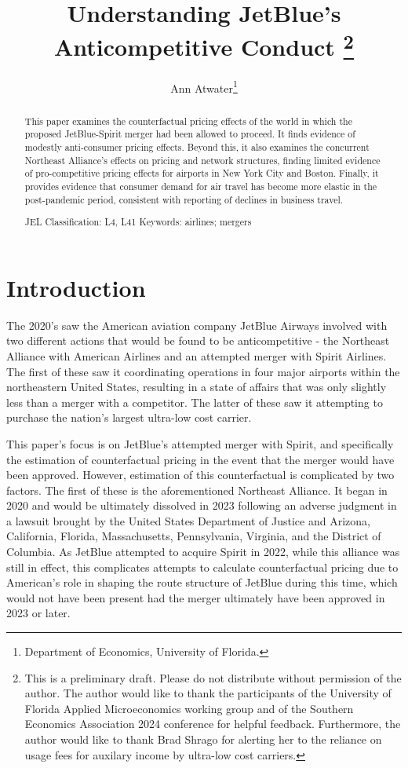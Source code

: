 \documentclass{article}
\author{Ann Atwater\footnote{Department of Economics, University of Florida.}}
\title{Understanding JetBlue's Anticompetitive Conduct \footnote{This is a preliminary draft. Please do not distribute without permission of the author. The author would like to thank the participants of the University of Florida Applied Microeconomics working group and of the Southern Economics Association 2024 conference for helpful feedback. Furthermore, the author would like to thank Brad Shrago for alerting her to the reliance on usage fees for auxilary income by ultra-low cost carriers. }}
\begin{document}
	\maketitle
	
	\begin{abstract}
	This paper examines the counterfactual pricing effects of the world in which the proposed JetBlue-Spirit merger had been allowed to proceed. It finds evidence of modestly anti-consumer pricing effects. Beyond this, it also examines the concurrent Northeast Alliance's effects on pricing and network structures, finding limited evidence of pro-competitive pricing effects for airports in New York City and Boston. Finally, it provides evidence that consumer demand for air travel has become more elastic in the post-pandemic period, consistent with reporting of declines in business travel.


		\bigskip
		
	\noindent JEL Classification: L4, L41 \newline
	\noindent Keywords: airlines; mergers
		
	\end{abstract}
	
	\pagebreak
	
	\doublespacing
	
	\section{Introduction}
	\label{sec:Introduction}
	The 2020's saw the American aviation company JetBlue Airways involved with two different actions that would be found to be anticompetitive - the Northeast Alliance with American Airlines and an attempted merger with Spirit Airlines. The first of these saw it coordinating operations in four major airports within the northeastern United States, resulting in a state of affairs that was only slightly less than a merger with a competitor. The latter of these saw it attempting to purchase the nation's largest ultra-low cost carrier. 
	
	This paper's focus is on JetBlue's attempted merger with Spirit, and specifically the estimation of counterfactual pricing in the event that the merger would have been approved. However, estimation of this counterfactual is complicated by two factors. The first of these is the aforementioned Northeast Alliance. It began in 2020 and would be ultimately dissolved in 2023 following an adverse judgment in a lawsuit brought by the United States Department of Justice and Arizona, California, Florida, Massachusetts, Pennsylvania, Virginia, and the District of Columbia. As JetBlue attempted to acquire Spirit in 2022, while this alliance was still in effect, this complicates attempts to calculate counterfactual pricing due to American's role in shaping the route structure of JetBlue during this time, which would not have been present had the merger ultimately have been approved in 2023 or later. 
	
\end{document}
